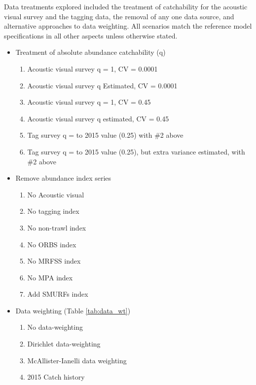 \documentclass[11pt,
  english,
  letterpaper,
]{article}
\providecommand{\tightlist}{%
  \setlength{\itemsep}{0pt}\setlength{\parskip}{0pt}}
\providecommand{\tightlist}{%
  \setlength{\itemsep}{0pt}\setlength{\parskip}{0pt}}
\begin{document}
Data treatments explored included the treatment of catchability for the acoustic visual survey and the tagging data, the removal of any one data source, and alternative approaches to data weighting. All scenarios match the reference model specifications in all other aspects unless otherwise stated.

\begin{itemize}
\tightlist
\item
  Treatment of absolute abundance catchability (q)

  \begin{enumerate}
  \def\labelenumi{\arabic{enumi}.}
  \tightlist
  \item
    Acoustic visual survey q = 1, CV = 0.0001
  \item
    Acoustic visual survey q Estimated, CV = 0.0001
  \item
    Acoustic visual survey q = 1, CV = 0.45
  \item
    Acoustic visual survey q estimated, CV = 0.45
  \item
    Tag survey q = to 2015 value (0.25) with \#2 above
  \item
    Tag survey q = to 2015 value (0.25), but extra variance estimated, with \#2 above
  \end{enumerate}
\item
  Remove abundance index series

  \begin{enumerate}
  \def\labelenumi{\arabic{enumi}.}
  \setcounter{enumi}{6}
  \tightlist
  \item
    No Acoustic visual
  \item
    No tagging index
  \item
    No non-trawl index
  \item
    No ORBS index
  \item
    No MRFSS index
  \item
    No MPA index
  \item
    Add SMURFs index
  \end{enumerate}
\item
  Data weighting (Table \ref{tab:data_wt})

  \begin{enumerate}
  \def\labelenumi{\arabic{enumi}.}
  \setcounter{enumi}{13}
  \tightlist
  \item
    No data-weighting
  \item
    Dirichlet data-weighting
  \item
    McAllister-Ianelli data weighting
  \item
    2015 Catch history
  \end{enumerate}
\end{itemize}
\end{document}
